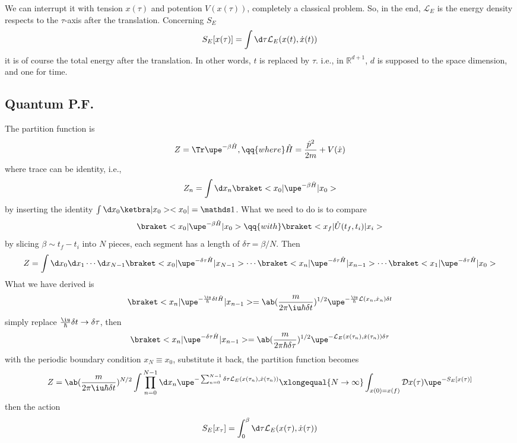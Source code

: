 \begin{center}
\end{center}
We can interrupt it with tension $x(\tau)$ and potention $V(x(\tau))$,
completely a classical problem.
So, in the end, $\mathcal L_E$ is the energy density respects to the $\tau$-axis after the translation.
Concerning $S_E$
\[
  S_E[x(\tau)] = \int \d\tau \mathcal L_E(x(t), \dot x(t))
\]
it is of course the total energy after the translation.
In other words, $t$ is replaced by $\tau$.
i.e., in $\mathbb R^{d+1}$,
$d$ is supposed to the space dimension, and one for time.

\subsection{Quantum P.F.}

The partition function is
\begin{equation}
  Z = \Tr \upe^{-\beta\hat H}, \qq{where} \hat H = \frac{\hat p^2}{2m} + V(\hat x)
\end{equation}
where trace can be identity, i.e.,
\[
  Z_n = \int \d x_n \braket<x_0|\upe^{-\beta\hat H}|x_0>
\]
by inserting the identity $\int \d x_0 \ketbra|x_0><x_0| = \identity$.
What we need to do is to compare
\[
  \braket<x_0|\upe^{-\beta\hat H}|x_0> \qq{with}
  \braket<x_f|\hat U(t_f, t_i)|x_i>
\]
by slicing $\beta \sim t_f - t_i$ into $N$ pieces, each segment has a length of
$\delta \tau = \beta/N$. Then
\[
  Z = \int \d x_0 \d x_1 \cdots \d x_{N-1}
      \braket<x_0|\upe^{-\delta\tau\hat H}|x_{N-1}> \cdots
      \braket<x_n|\upe^{-\delta\tau\hat H}|x_{n-1}> \cdots
      \braket<x_1|\upe^{-\delta\tau\hat H}|x_0>
\]
What we have derived is
\[
  \braket<x_n|\upe^{-\frac\iu\hbar\delta t\hat H}|x_{n-1}>
= \ab(\frac{m}{2\pi\iu\hbar\delta t})^{1/2} \upe^{-\frac\iu\hbar \mathcal L(x_n, \dot x_n)\delta t}
\]
simply replace $\frac\iu\hbar\delta t \to \delta \tau$, then
\[
  \braket<x_n|\upe^{-\delta\tau\hat H}|x_{n-1}>
= \ab(\frac m{2\pi\hbar\delta\tau})^{1/2} \upe^{-\mathcal L_E(x(\tau_n), \dot x(\tau_n))\delta\tau}
\]
with the periodic boundary condition $x_N \equiv x_0$,
substitute it back, the partition function becomes
\begin{equation}
  Z = \ab(\frac{m}{2\pi\iu\hbar\delta t})^{N/2} \int \prod_{n=0}^{N-1} \d x_n
  \upe^{-\sum_{n=0}^{N-1} \delta\tau \mathcal L_E(x(\tau_n), \dot x(\tau_n))}
  \xlongequal{N\to\infty} \int_{x(0) = x(f)} \mathcal D x(\tau) \upe^{-S_E[x(\tau)]}
\end{equation}
then the action
\begin{equation}
  S_E[x_\tau] = \int_{0}^\beta \d \tau \mathcal L_E(x(\tau), \dot x(\tau))
\end{equation}

